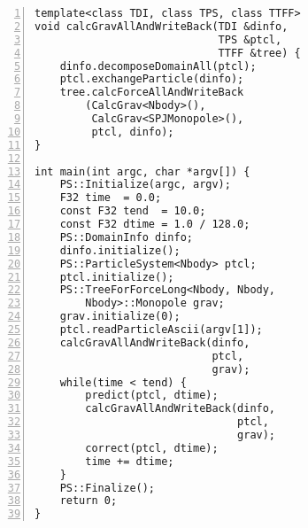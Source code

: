 \begin{lstlisting}[label=code:samplecode,numbers=left,numbersep=5pt,frame=single,basicstyle=\ttfamily]
template<class TDI, class TPS, class TTFF>
void calcGravAllAndWriteBack(TDI &dinfo,
                             TPS &ptcl,
                             TTFF &tree) {
    dinfo.decomposeDomainAll(ptcl);
    ptcl.exchangeParticle(dinfo);    
    tree.calcForceAllAndWriteBack
        (CalcGrav<Nbody>(),
         CalcGrav<SPJMonopole>(),
         ptcl, dinfo);    
}

int main(int argc, char *argv[]) {
    PS::Initialize(argc, argv);                               
    F32 time  = 0.0;
    const F32 tend  = 10.0;
    const F32 dtime = 1.0 / 128.0;
    PS::DomainInfo dinfo;
    dinfo.initialize();
    PS::ParticleSystem<Nbody> ptcl;
    ptcl.initialize();
    PS::TreeForForceLong<Nbody, Nbody,
        Nbody>::Monopole grav;
    grav.initialize(0);
    ptcl.readParticleAscii(argv[1]);
    calcGravAllAndWriteBack(dinfo,
                            ptcl,
                            grav);
    while(time < tend) {
        predict(ptcl, dtime);        
        calcGravAllAndWriteBack(dinfo,
                                ptcl,
                                grav);
        correct(ptcl, dtime);        
        time += dtime;
    }
    PS::Finalize();
    return 0;
}
\end{lstlisting}
